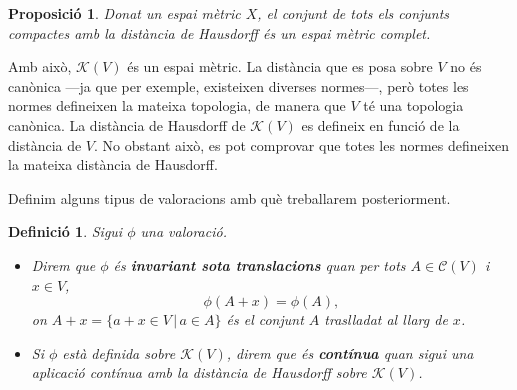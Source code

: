 \documentclass{article}
\newtheorem{definicio}{Definici\'{o}}
\newtheorem{proposicio}{Proposici\'{o}}
\theoremstyle{definition}
\newtheorem{exemple}{Exemple}
\DeclareMathOperator{\dist}{dist}
\begin{document}
%
%
%
%
%
%
\begin{proposicio}
Donat un espai m\`{e}tric $X$, el conjunt de tots els conjunts compactes amb la dist\`{a}ncia de Hausdorff \'{e}s un espai m\`{e}tric complet.
\end{proposicio}

Amb aix\`{o}, $\mathcal{K}(V)$ \'{e}s un espai m\`{e}tric. La dist\`{a}ncia que es posa sobre $V$ no \'{e}s can\`{o}nica ---ja que per exemple, existeixen diverses normes---, per\`{o} totes les normes defineixen la mateixa topologia, de manera que $V$ t\'{e} una topologia can\`{o}nica. La dist\`{a}ncia de Hausdorff de $\mathcal{K}(V)$ es defineix en funci\'{o} de la dist\`{a}ncia de $V$. No obstant aix\`{o}, es pot comprovar que totes les normes defineixen la mateixa dist\`{a}ncia de Hausdorff.

Definim alguns tipus de valoracions amb qu\`{e} treballarem posteriorment.

\begin{definicio}
Sigui $\phi$ una valoraci\'{o}.
\begin{itemize}

\item Direm que $\phi$ \'{e}s \textbf{invariant sota translacions} quan per tots $A\in\mathcal{C}(V)$ i $x\in V$,
\[\phi(A+x)=\phi(A),\]
on $A+x=\{a+x\in V\,|\,a\in A\}$ \'{e}s el conjunt $A$ traslladat al llarg de $x$.

\item Si $\phi$ est\`{a} definida sobre $\mathcal{K}(V)$, direm que \'{e}s \textbf{cont\'{i}nua} quan sigui una aplicaci\'{o} cont\'{i}nua amb la dist\`{a}ncia de Hausdorff sobre $\mathcal{K}(V)$. 
\end{itemize}
\end{definicio}
\end{document}
